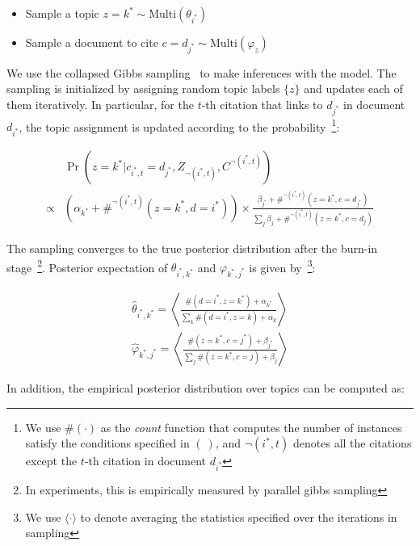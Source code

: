 \begin{itemize}
\item Sample a topic $z=k^* \sim \mathrm{Multi}(\theta_{i^*})$
\item Sample a document to cite $c = d_{j^*} \sim \mathrm{Multi}(\varphi_z)$
\end{itemize}

We use the collapsed Gibbs sampling~\cite{griffiths2004finding} to make
inferences with the model.  The sampling is initialized by assigning random
topic labels $\{z\}$ and updates each of them iteratively. In particular, for
the $t$-th citation that links to $d_{j^*}$ in document $d_{i^*}$, the topic
assignment is updated according to the probability~\footnote{We use $\#(\cdot)$
  as the \emph{count} function that computes the number of instances satisfy the
  conditions specified in $(~)$, and $\neg (i^*, t)$ denotes all the citations
except the $t$-th citation in document $d_{i^*}$}:

\begin{align}
  & \Pr( z = k^* |  c_{i^*, t} = d_{j^*},  Z_{\neg (i^*,t)}, C^{\neg (i^*, t)} )
  \nonumber \\
  \propto &
  \left(\alpha_{k^*} + \#^{\neg (i^*, t)} (z = k^*, d=i^*) \right)
  \times
  \frac{\beta_{j^*} + \#^{\neg (i^*, t)} (z= k^*, c = d_{j^*} )}{
      \sum\limits_j \beta_{j} + \#^{\neg (i^*, t)} (z= k^*, c = d_{j} )}
  \label{eq::citation_eq_samp}
\end{align}

The sampling converges to the true posterior distribution after the burn-in
stage~\footnote{In experiments, this is empirically measured by
parallel gibbs sampling}. Posterior expectation of $\theta_{i^*,k^*}$ and
$\varphi_{k^*, j^*}$ is given by~\footnote{We use $\langle \cdot
\rangle$ to denote averaging the statistics specified over the iterations in
sampling}:

\begin{align}
\hat\theta_{i^*,k^*}  =
  \left\langle \frac{\#(d= i^*, z = k^*) + \alpha_{k^*}}{
                \sum\limits_k \#(d= i^*, z = k) + \alpha_{k}}
  \right\rangle\label{eq::citation_eq_theta}\\
\hat\varphi_{k^*, j^*} =
  \left\langle \frac{\#(z = k^*, c = j^*) + \beta_{j^*}}{
                \sum\limits_j \#(z = k^*, c = j) + \beta_{j}}
  \right\rangle\label{eq::citation_eq_phi}
\end{align}

In addition, the empirical posterior  distribution over topics can be computed
as:


